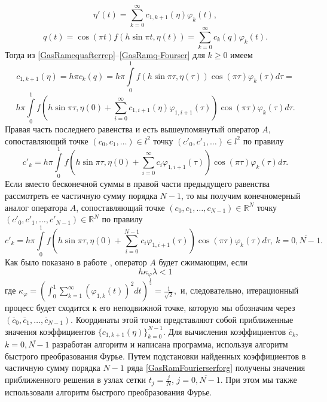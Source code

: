 \begin{equation}\label{GasRamg-Fourser}
\eta{'}(t) =  \sum_{k=0}^\infty c_{1,k+1}(\eta)\varphi_k(t),
\end{equation}
\begin{equation}\label{GasRamq-Fourser}
q(t)=\cos(\pi t) f(h\sin \pi t,\eta(t)) = \sum_{k=0}^\infty c_{k}(q)\varphi_k(t).
\end{equation}
Тогда из \eqref{GasRamequafterrep}--\eqref{GasRamq-Fourser} для $k\geq0$ имеем
$$
c_{1,k+1}(\eta)=h\pi c_{k}(q)=h\pi\int\limits_0^1 f(h\sin \pi \tau,\eta(\tau))\cos(\pi \tau)\varphi_k(\tau)d\tau=
$$
$$
h\pi\int\limits_0^1 f\left(h\sin \pi \tau, \eta(0)+\sum_{i=0}^\infty c_{1,i+1}(\eta)\varphi_{1,i+1}(\tau)\right)\cos(\pi \tau)\varphi_k(\tau)d\tau.
$$
Правая часть последнего равенства и есть вышеупомянутый оператор $A$, сопоставляющий точке $(c_0,c_1, \ldots)\in l^2$ точку $(c'_0,c'_1, \ldots)\in l^2$ по правилу
$$
c'_k=h\pi\int\limits_0^1 f\left(h\sin \pi \tau, \eta(0)+\sum_{i=0}^\infty c_{i}\varphi_{1,i+1}(\tau)\right)\cos(\pi \tau)\varphi_k(\tau)d\tau.
$$
Если вместо бесконечной суммы в правой части предыдущего равенства рассмотреть ее частичную сумму порядка $N-1$, то мы получим конечномерный аналог оператора $A$, сопоставляющий точке $(c_0,c_1, \ldots, c_{N-1})\in \mathbb{R}^N$ точку $(c'_0,c'_1, \ldots, c'_{N-1})\in \mathbb{R}^N$ по правилу
$$
c'_k=h\pi\int\limits_0^1 f\left(h\sin \pi \tau, \eta(0)+\sum_{i=0}^{N-1} c_{i}\varphi_{1,i+1}(\tau)\right)\cos(\pi \tau)\varphi_k(\tau)d\tau,\ k=\overline{0, N-1}.
$$
Как было показано в работе \cite{RamSharDemr}, оператор $A$ будет сжимающим, если
\begin{equation}\label{GasRamconditionfor_h}
h\kappa_\varphi\lambda<1
\end{equation}
где
$
\kappa_{\varphi}=\left(\int_0^1\sum_{k=1}^{\infty}
(\varphi_{1,k}(t))  ^2dt\right)^{\frac12}=\frac{1}{\sqrt{2}},
$
и, следовательно, итерационный процесс будет сходится к его неподвижной точке, которую мы обозначим через $(\overline{c}_0,\overline{c}_1, \ldots, \overline{c}_{N-1})$. Координаты этой точки представляют собой приближенные значения коэффициентов $\{c_{1,k+1}(\eta)\}_{k=0}^{N-1}$.
Для вычисления коэффициентов $\overline{c}_k$, $k=\overline{0, N-1}$ разработан алгоритм и написана программа, используя алгоритм быстрого преобразования Фурье.
Путем подстановки найденных коэффициентов в частичную сумму порядка $N-1$ ряда \eqref{GasRamFourierserforg} получены значения приближенного решения в узлах сетки $t_j=\frac{j}{N}$, $j=\overline{0, N-1}$. При этом мы также использовали алгоритм быстрого преобразования Фурье.

